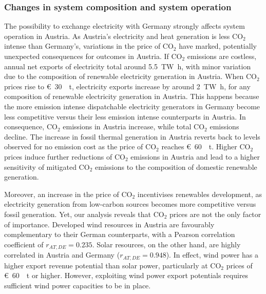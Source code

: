 \documentclass[review, 3p, times, 12pt]{elsarticle} %
\newcommand{\COO}{\ensuremath{\mathrm{CO_2}} }
\begin{document}
\subsubsection{Changes in system composition and system operation}
The possibility to exchange electricity with Germany strongly affects system operation in Austria.
As Austria's electricity and heat generation is less \COO intense than Germany's, variations in the price of \COO
have marked, potentially unexpected consequences for outcomes in Austria.
If \COO emissions are costless, annual net exports of electricity total around \SI{5.5}{\tera\watt\hour}, with
minor variation due to the composition of renewable electricity generation in Austria.
When \COO prices rise to \SI{30}[\euro]{\per\tonne}, electricity exports increase by around \SI{2}{\tera\watt\hour},
for any composition of renewable electricity generation in Austria.
This happens because the more emission intense dispatchable electricity generators in Germany become less competitive
versus their less emission intense counterparts in Austria.
In consequence, \COO emissions in Austria increase, while total \COO emissions decline.
The increase in fossil thermal generation in Austria reverts back to levels observed for no emission cost as the
price of \COO reaches \SI{60}[\euro]{\per\tonne}.
Higher \COO prices induce further reductions of \COO emissions in Austria and lead to a higher sensitivity of
mitigated \COO emissions to the composition of domestic renewable generation.

Moreover, an increase in the price of \COO incentivises renewables development, as electricity generation from
low-carbon sources becomes more competitive versus fossil generation.
Yet, our analysis reveals that \COO prices are not the only factor of importance.
Developed wind resources in Austria are favourably complementary to their German counterparts, with a Pearson
correlation coefficient of $r_{AT,DE} = 0.235$.
Solar resources, on the other hand, are highly correlated in Austria and Germany ($r_{AT,DE}=0.948$).
In effect, wind power has a higher export revenue potential than solar power, particularly at \COO prices of
\SI{60}[\euro]{\per\tonne} or higher.
However, exploiting wind power export potentials requires sufficient wind power capacities to be in place.
\end{document}
